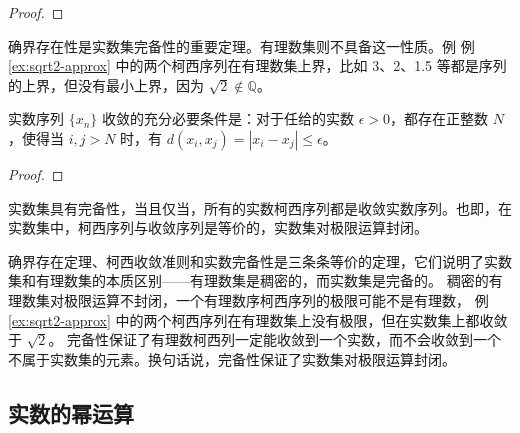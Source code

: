 \begin{proof}
    
\end{proof}

\begin{note}
    确界存在性是实数集完备性的重要定理。有理数集则不具备这一性质。例 例 \ref{ex:sqrt2-approx} 中的两个柯西序列在有理数集上界，比如 3、2、1.5 等都是序列的上界，但没有最小上界，因为 $\sqrt{2}\notin\mathbb{Q}$。
\end{note}


\begin{theorem}
    实数序列 $\{x_n\}$ 收敛的充分必要条件是：对于任给的实数 $\epsilon>0$，都存在正整数 $N$，使得当 $i,j>N$ 时，有 $d(x_i,x_j) = |x_i - x_j| \le \epsilon$。
\end{theorem}
\begin{proof}
    
\end{proof}


\begin{theorem}
    实数集具有完备性，当且仅当，所有的实数柯西序列都是收敛实数序列。也即，在实数集中，柯西序列与收敛序列是等价的，实数集对极限运算封闭。
\end{theorem}

\begin{note}
    确界存在定理、柯西收敛准则和实数完备性是三条条等价的定理，它们说明了实数集和有理数集的本质区别——有理数集是稠密的，而实数集是完备的。
    稠密的有理数集对极限运算不封闭，一个有理数序柯西序列的极限可能不是有理数，
    例 \ref{ex:sqrt2-approx} 中的两个柯西序列在有理数集上没有极限，但在实数集上都收敛于 $\sqrt{2}$。
    完备性保证了有理数柯西列一定能收敛到一个实数，而不会收敛到一个不属于实数集的元素。换句话说，完备性保证了实数集对极限运算封闭。
\end{note}

\vspace{1em}



\subsection{实数的幂运算}



\newpage